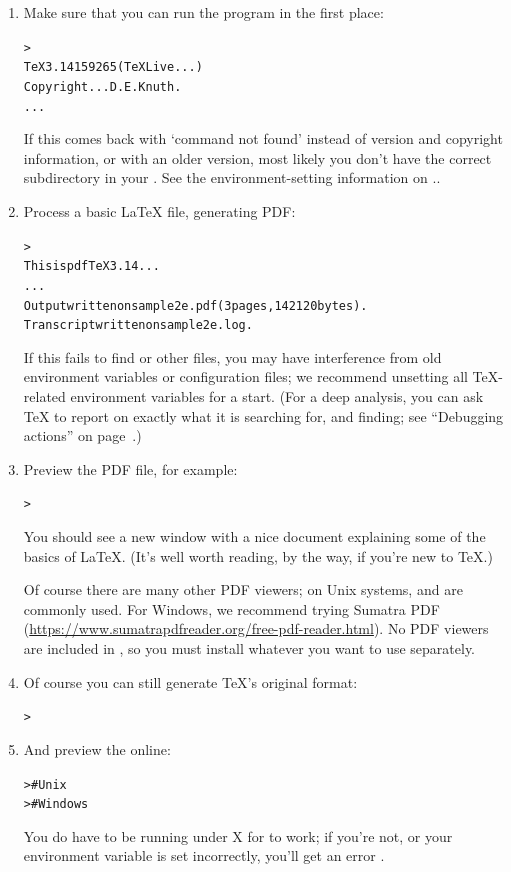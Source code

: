 \documentclass[12pt]{article}
\begin{document}
\begin{enumerate}

\item Make sure that you can run the  program in the first
place:
\begin{alltt}
> 
TeX 3.14159265 (TeX Live ...)
Copyright ... D.E. Knuth.
...
\end{alltt}
If this comes back with `command not found' instead of version and
copyright information, or with an older version, most likely you don't
have the correct  subdirectory in your .  See
the environment-setting information on \p.\pageref{sec:env}.

\item Process a basic \LaTeX{} file, generating PDF:
\begin{alltt}
> 
This is pdfTeX 3.14...
...
Output written on sample2e.pdf (3 pages, 142120 bytes).
Transcript written on sample2e.log.
\end{alltt}
If this fails to find  or other files,
you may have interference from old environment variables or
configuration files; we recommend unsetting all \TeX-related environment
variables for a start.  (For a deep analysis, you can ask \TeX{} to
report on exactly what it is searching for, and finding; see ``Debugging
actions'' on page~\pageref{sec:debugging}.)

\item Preview the PDF file, for example:
\begin{alltt}
> 
\end{alltt}
You should see a new window with a nice document explaining some of the
basics of \LaTeX{}.  (It's well worth reading, by the way, if you're new
to \TeX.)  

Of course there are many other PDF viewers; on Unix systems,
 and  are commonly used. For Windows, we
recommend trying Sumatra PDF
(\url{https://www.sumatrapdfreader.org/free-pdf-reader.html}). No PDF
viewers are included in \TL{}, so you must install whatever you want to
use separately.

\item Of course you can still generate \TeX's original \dvi{} format:
\begin{alltt}
> 
\end{alltt}

\item And preview the \dvi{} online:
\begin{alltt}
>     # Unix
>   # Windows
\end{alltt}
You do have to be running under X for  to work; if
you're not, or your  environment variable is set
incorrectly, you'll get an error .


\end{enumerate}
\end{document}
